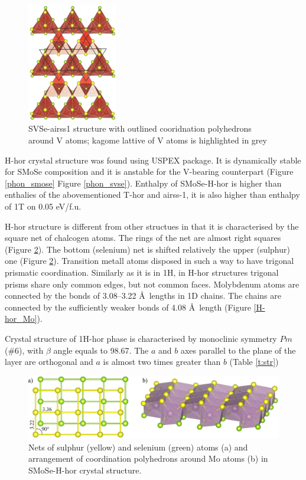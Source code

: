 \documentclass[a4paperm]{article}
\begin{document}
\begin{figure}[H]
        \includegraphics[width=0.35\textwidth]{airss1_v_poly.png}
        \caption{SVSe-airss1 structure with outlined cooridnation polyhedrons around V atoms; kagome lattive of V atoms is highlighted in grey}
\label{airss1_poly}
\end{figure}



H-hor crystal structure was found using USPEX package.
It is dynamically stable for SMoSe composition and it is anstable for the V-bearing counterpart (Figure \ref{phon_smose} Figure \ref{phon_svse}).
Enthalpy of SMoSe-H-hor is higher than enthalies of the abovementioned T-hor and airss-1, it is also higher than enthalpy of 1T on 0.05 eV/f.u.

H-hor structure is different from other structues in that it is characterised by the square net of chalcogen atoms.
The rings of the net are almost right squares (Figure \ref{H-hor}).
The bottom (selenium) net is shifted relatively the upper (sulphur) one (Figure \ref{H-hor}).
Transition metall atoms disposed in such a way to have trigonal prismatic coordination.
Similarly as it is in 1H, in H-hor structures trigonal prisms share only common edges, but not common faces.
Molybdenum atoms are connected by the bonds of 3.08--3.22 \AA\ lengths in 1D chains.
The chains are connected by the sufficiently weaker bonds of 4.08 \AA\ length (Figure \ref{H-hor_Mo}).

Crystal structure of 1H-hor phase is characterised by monoclinic symmetry $Pm$ (\#6), with $\beta$ angle equals to 98.67\textdegree.
The $a$ and $b$ axes parallel to the plane of the layer are orthogonal and $a$ is almost two times greater than $b$ (Table \ref{t:str})

\begin{figure}[H]
	\includegraphics[width=\textwidth]{H-hor.png}
	\caption{Nets of sulphur (yellow) and selenium (green) atoms (a) and arrangement of coordination polyhedrons around Mo atoms (b) in SMoSe-H-hor crystal structure.}
\label{H-hor}
\end{figure} 
\end{document}
